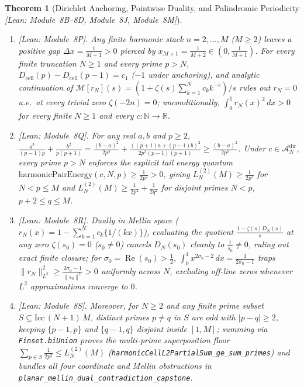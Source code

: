 \documentclass[11pt,a4paper]{article}
\newtheorem{theorem}{Theorem}[section]
\theoremstyle{definition}
\newcommand{\R}{\mathbb{R}}
\newcommand{\N}{\mathbb{N}}
\newcommand{\Acal}{\mathcal{A}}
\begin{document}
\begin{theorem}[Dirichlet Anchoring, Pointwise Duality, and Palindromic Periodicity \emph{[Lean: Module~8B--8D, Module~8J, Module~8M]}]
\begin{enumerate}[leftmargin=1.8em,itemsep=2pt]
\item \emph{[Lean: Module~8P].} Any finite harmonic stack $n = 2,\dots,M$ ($M \ge 2$) leaves a positive gap $\Delta x = \tfrac{1}{M+1} > 0$ pierced by $x_{M+1} = \tfrac{1}{M+2} \in (0, \tfrac{1}{M+1})$. For every finite truncation $N \ge 1$ and every prime $p > N$, $D_{\mathrm{cell}}(p) - D_{\mathrm{cell}}(p-1) = c_1$ ($-1$ under anchoring), and analytic continuation of $\mathcal{M}[r_N](s) = (1 + \zeta(s)\sum_{k=1}^N c_k k^{-s})/s$ rules out $r_N = 0$ a.e.\ at every trivial zero $\zeta(-2n) = 0$; unconditionally, $\int_0^1 r_N(x)^2\,dx > 0$ for every finite $N \ge 1$ and every $c : \N \to \R$.
\item \emph{[Lean: Module~8Q].} For any real $a,b$ and $p \ge 2$, $\frac{a^2}{(p-1)p} + \frac{b^2}{p(p+1)} = \frac{(b-a)^2}{2p^2} + \frac{((p+1)a + (p-1)b)^2}{2p^2(p-1)(p+1)} \ge \frac{(b-a)^2}{2p^2}$. Under $c \in \Acal_N^{\mathrm{dir}}$, every prime $p > N$ enforces the explicit tail energy quantum $\mathrm{harmonicPairEnergy}(c,N,p) \ge \tfrac{1}{2p^2} > 0$, giving $L_N^{(2)}(M) \ge \tfrac{1}{2p^2}$ for $N < p \le M$ and $L_N^{(2)}(M) \ge \tfrac{1}{2p^2} + \tfrac{1}{2q^2}$ for disjoint primes $N < p$, $p+2 \le q \le M$.
\item \emph{[Lean: Module~8R].} Dually in Mellin space ($r_N(x) = 1 - \sum_{k=1}^N c_k \{1/(kx)\}$), evaluating the quotient $\frac{1 - \zeta(s)D_N(s)}{s}$ at any zero $\zeta(s_0)=0$ ($s_0 \neq 0$) cancels $D_N(s_0)$ cleanly to $\tfrac{1}{s_0} \neq 0$, ruling out exact finite closure; for $\sigma_0 = \operatorname{Re}(s_0) > \tfrac{1}{2}$, $\int_0^1 x^{2\sigma_0 - 2}\,dx = \tfrac{1}{2\sigma_0 - 1}$ traps $\|r_N\|_{L^2}^2 \ge \tfrac{2\sigma_0 - 1}{\|s_0\|^2} > 0$ uniformly across $N$, excluding off-line zeros whenever $L^2$ approximations converge to $0$.
\item \emph{[Lean: Module~8S].} Moreover, for $N \ge 2$ and any finite prime subset $S \subseteq \mathrm{Icc}\,(N+1)\,M$, distinct primes $p \neq q$ in $S$ are odd with $|p - q| \ge 2$, keeping $\{p-1,p\}$ and $\{q-1,q\}$ disjoint inside $[1,M]$; summing via \texttt{Finset.biUnion} proves the multi-prime superposition floor $\sum_{p \in S} \tfrac{1}{2p^2} \le L_N^{(2)}(M)$ (\texttt{harmonicCellL2PartialSum\_\allowbreak ge\_\allowbreak sum\_\allowbreak primes}) and bundles all four coordinate and Mellin obstructions in \texttt{planar\_\allowbreak mellin\_\allowbreak dual\_\allowbreak contradiction\_\allowbreak capstone}.

\end{enumerate}
\end{theorem}
\end{document}
